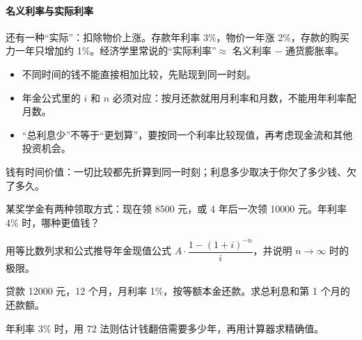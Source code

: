 \paragraph{名义利率与实际利率}
还有一种“实际”：扣除物价上涨。存款年利率 3\%，物价一年涨 2\%，存款的购买力一年只增加约 1\%。经济学里常说的“实际利率”$\approx$ 名义利率 $-$ 通货膨胀率。

\begin{pitfall}
\begin{itemize}
  \item 不同时间的钱不能直接相加比较，先贴现到同一时刻。
  \item 年金公式里的 $i$ 和 $n$ 必须对应：按月还款就用月利率和月数，不能用年利率配月数。
  \item “总利息少”不等于“更划算”，要按同一个利率比较现值，再考虑现金流和其他投资机会。
\end{itemize}
\end{pitfall}

\begin{oneline}
钱有时间价值：一切比较都先折算到同一时刻；利息多少取决于你欠了多少钱、欠了多久。
\end{oneline}

\begin{exercises}[练一练]
  \item 某奖学金有两种领取方式：现在领 8500 元，或 4 年后一次领 10000 元。年利率 4\% 时，哪种更值钱？
  \item 用等比数列求和公式推导年金现值公式 $A\cdot\dfrac{1-(1+i)^{-n}}{i}$，并说明 $n\to\infty$ 时的极限。
  \item 贷款 12000 元，12 个月，月利率 1\%，按等额本金还款。求总利息和第 1 个月的还款额。
  \item 年利率 3\% 时，用 72 法则估计钱翻倍需要多少年，再用计算器求精确值。
\end{exercises}
